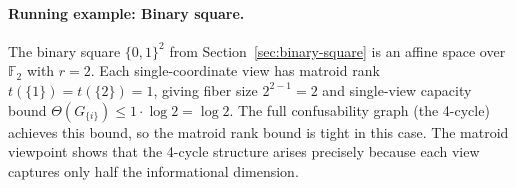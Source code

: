 \paragraph{Running example: Binary square.}
The binary square $\{0,1\}^2$ from Section~\ref{sec:binary-square} is an affine space over $\mathbb{F}_2$ with $r=2$. Each single-coordinate view has matroid rank $t(\{1\}) = t(\{2\}) = 1$, giving fiber size $2^{2-1} = 2$ and single-view capacity bound $\Theta(G_{\{i\}}) \le 1 \cdot \log 2 = \log 2$. The full confusability graph (the 4-cycle) achieves this bound, so the matroid rank bound is tight in this case. The matroid viewpoint shows that the 4-cycle structure arises precisely because each view captures only half the informational dimension.
